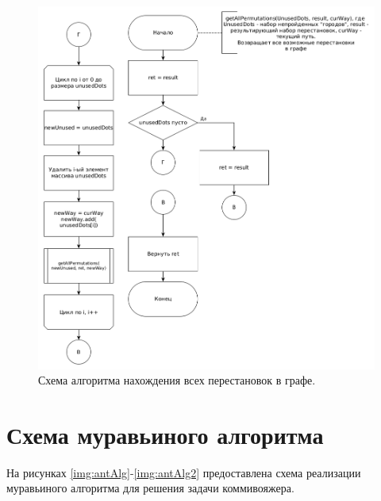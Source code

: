 \documentclass[12pt]{report}
\begin{document}
\begin{figure}
\begin{center}
\includegraphics[scale=0.4]{inc/img/bruteForce2.png}
\captionsetup{justification=centering}
	\caption{Схема алгоритма нахождения всех перестановок в графе.}
	\label{img:bruteForce2}	
\end{center}
\end{figure}


\section{Схема муравьиного алгоритма}
На рисунках \ref{img:antAlg}-\ref{img:antAlg2} предоставлена схема реализации муравьиного алгоритма для решения задачи коммивояжера.
\end{document}
